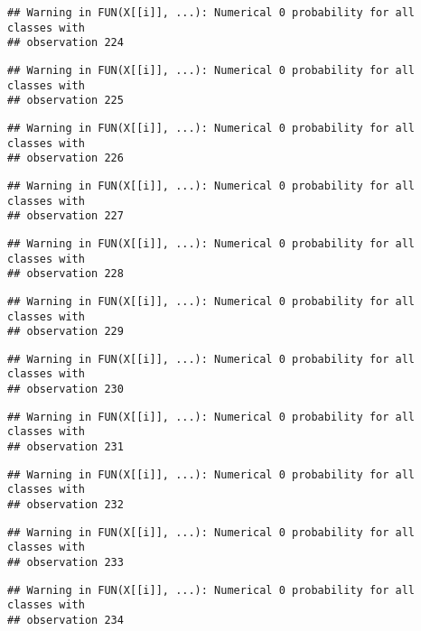 \documentclass[
]{article}
\begin{document}
\begin{verbatim}
## Warning in FUN(X[[i]], ...): Numerical 0 probability for all classes with
## observation 224
\end{verbatim}

\begin{verbatim}
## Warning in FUN(X[[i]], ...): Numerical 0 probability for all classes with
## observation 225
\end{verbatim}

\begin{verbatim}
## Warning in FUN(X[[i]], ...): Numerical 0 probability for all classes with
## observation 226
\end{verbatim}

\begin{verbatim}
## Warning in FUN(X[[i]], ...): Numerical 0 probability for all classes with
## observation 227
\end{verbatim}

\begin{verbatim}
## Warning in FUN(X[[i]], ...): Numerical 0 probability for all classes with
## observation 228
\end{verbatim}

\begin{verbatim}
## Warning in FUN(X[[i]], ...): Numerical 0 probability for all classes with
## observation 229
\end{verbatim}

\begin{verbatim}
## Warning in FUN(X[[i]], ...): Numerical 0 probability for all classes with
## observation 230
\end{verbatim}

\begin{verbatim}
## Warning in FUN(X[[i]], ...): Numerical 0 probability for all classes with
## observation 231
\end{verbatim}

\begin{verbatim}
## Warning in FUN(X[[i]], ...): Numerical 0 probability for all classes with
## observation 232
\end{verbatim}

\begin{verbatim}
## Warning in FUN(X[[i]], ...): Numerical 0 probability for all classes with
## observation 233
\end{verbatim}

\begin{verbatim}
## Warning in FUN(X[[i]], ...): Numerical 0 probability for all classes with
## observation 234
\end{verbatim}
\end{document}
